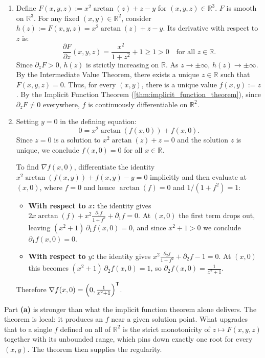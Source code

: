 \begin{exercisesolution}
\label{sol:implicit_function_arctan}
\begin{enumerate}[label=\textbf{(\alph*)}]
  \item Define $F(x,y,z) := x^2 \arctan(z) + z - y$ for $(x,y,z) \in \mathbb{R}^3$. $F$ is smooth on $\mathbb{R}^3$.
For any fixed $(x,y) \in \mathbb{R}^2$, consider $h(z) := F(x,y,z) = x^2 \arctan(z) + z - y$. Its derivative with respect to $z$ is:
\[\frac{\partial F}{\partial z}(x,y,z) = \frac{x^2}{1+z^2} + 1 \ge 1 > 0 \quad \text{for all } z \in \mathbb{R}.\]
Since $\partial_z F > 0$, $h(z)$ is strictly increasing on $\mathbb{R}$. As $z \to \pm\infty$, $h(z) \to \pm\infty$. By the Intermediate Value Theorem, there exists a unique $z \in \mathbb{R}$ such that $F(x,y,z) = 0$.
Thus, for every $(x,y)$, there is a unique value $f(x,y) := z$. By the Implicit Function Theorem (\cref{thm:implicit_function_theorem}), since $\partial_z F \neq 0$ everywhere, $f$ is continuously differentiable on $\mathbb{R}^2$.

  \item Setting $y = 0$ in the defining equation:
\[0 = x^2 \arctan(f(x,0)) + f(x,0).\]
Since $z = 0$ is a solution to $x^2 \arctan(z) + z = 0$ and the solution $z$ is unique, we conclude $f(x,0) = 0$ for all $x \in \mathbb{R}$.

To find $\nabla f(x,0)$, differentiate the identity $x^2 \arctan(f(x,y)) + f(x,y) - y = 0$ implicitly
and then evaluate at $(x,0)$, where $f = 0$ and hence $\arctan(f) = 0$ and $1/(1+f^2) = 1$:
\begin{itemize}
  \item \textbf{With respect to $x$:} the identity gives $2x \arctan(f) + x^2 \frac{\partial_1 f}{1+f^2} + \partial_1 f = 0$. At $(x,0)$ the first term drops out, leaving $(x^2+1)\,\partial_1 f(x,0) = 0$, and since $x^2 + 1 > 0$ we conclude $\partial_1 f(x,0) = 0$.
  \item \textbf{With respect to $y$:} the identity gives $x^2 \frac{\partial_2 f}{1+f^2} + \partial_2 f - 1 = 0$. At $(x,0)$ this becomes $(x^2+1)\,\partial_2 f(x,0) = 1$, so $\partial_2 f(x,0) = \frac{1}{x^2+1}$.
\end{itemize}
Therefore $\nabla f(x,0) = \left(0, \frac{1}{x^2+1}\right)^{\mathsf{T}}$.
\end{enumerate}
\begin{remark}
Part \textbf{(a)} is stronger than what the implicit function theorem alone delivers. The theorem is
local: it produces an $f$ near a given solution point. What upgrades that to a single $f$ defined on
all of $\mathbb{R}^2$ is the strict monotonicity of $z \mapsto F(x,y,z)$ together with its unbounded
range, which pins down exactly one root for every $(x,y)$. The theorem then supplies the regularity.
\end{remark}
\end{exercisesolution}

